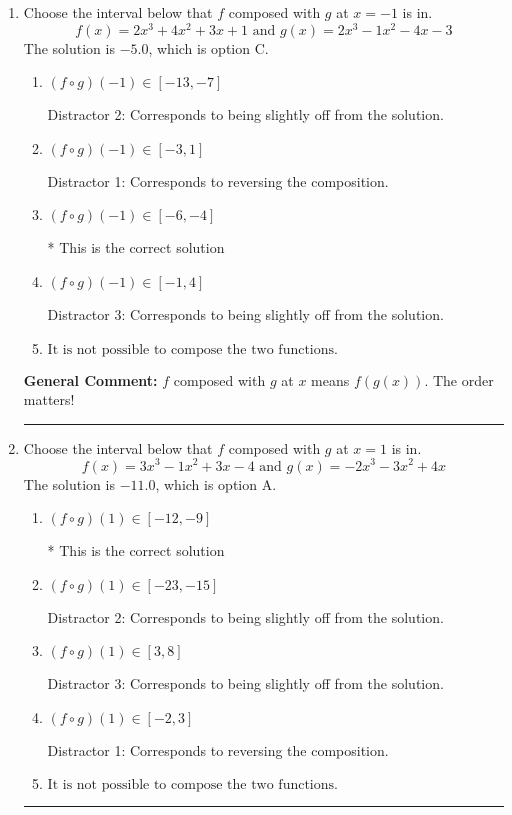 \documentclass{extbook}[14pt]
\newcommand{\litem}[1]{\item #1

\rule{\textwidth}{0.4pt}}
\begin{document}
\begin{enumerate}\litem{
Choose the interval below that $f$ composed with $g$ at $x=-1$ is in.
\[ f(x) = 2x^{3} +4 x^{2} +3 x + 1 \text{ and } g(x) = 2x^{3} -1 x^{2} -4 x -3 \]The solution is \( -5.0 \), which is option C.\begin{enumerate}[label=\Alph*.]
\item \( (f \circ g)(-1) \in [-13, -7] \)

 Distractor 2: Corresponds to being slightly off from the solution.
\item \( (f \circ g)(-1) \in [-3, 1] \)

 Distractor 1: Corresponds to reversing the composition.
\item \( (f \circ g)(-1) \in [-6, -4] \)

* This is the correct solution
\item \( (f \circ g)(-1) \in [-1, 4] \)

 Distractor 3: Corresponds to being slightly off from the solution.
\item \( \text{It is not possible to compose the two functions.} \)


\end{enumerate}

\textbf{General Comment:} $f$ composed with $g$ at $x$ means $f(g(x))$. The order matters!
}
\litem{
Choose the interval below that $f$ composed with $g$ at $x=1$ is in.
\[ f(x) = 3x^{3} -1 x^{2} +3 x -4 \text{ and } g(x) = -2x^{3} -3 x^{2} +4 x \]The solution is \( -11.0 \), which is option A.\begin{enumerate}[label=\Alph*.]
\item \( (f \circ g)(1) \in [-12, -9] \)

* This is the correct solution
\item \( (f \circ g)(1) \in [-23, -15] \)

 Distractor 2: Corresponds to being slightly off from the solution.
\item \( (f \circ g)(1) \in [3, 8] \)

 Distractor 3: Corresponds to being slightly off from the solution.
\item \( (f \circ g)(1) \in [-2, 3] \)

 Distractor 1: Corresponds to reversing the composition.
\item \( \text{It is not possible to compose the two functions.} \)


\end{enumerate}

}
\end{enumerate}
\end{document}
